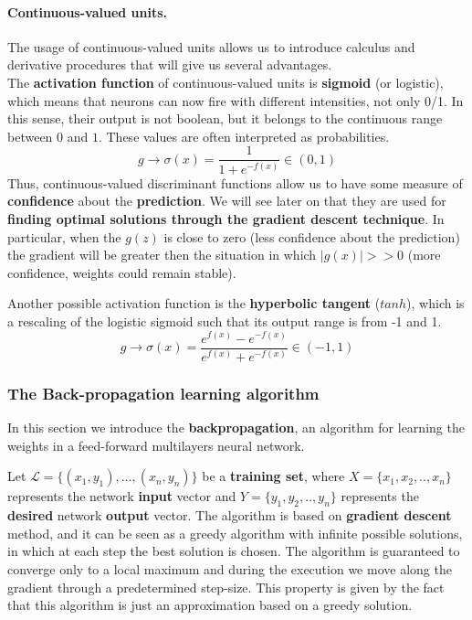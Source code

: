 

\paragraph*{Continuous-valued units.} The usage of continuous-valued units allows us to introduce calculus and derivative procedures that will give us several advantages.\\ 
The \textbf{activation function} of continuous-valued units is \textbf{sigmoid} (or logistic), which means that neurons can now fire with different intensities, not only 0/1. In this sense, their output is not boolean, but it belongs to the continuous range between $0$ and $1$. These values are often interpreted as probabilities.
$$g \rightarrow \sigma(x) = \frac{1}{1+e^{-f(x)}} \in (0,1)$$
Thus, continuous-valued discriminant functions allow us to have some measure of \textbf{confidence} about the \textbf{prediction}. We will see later on that they are used for \textbf{finding optimal solutions through the gradient descent technique}. In particular, when the $g(z)$ is close to zero (less confidence about the prediction) the gradient will be greater then the situation in which $|g(x)| >> 0$ (more confidence, weights could remain stable).

Another possible activation function is the \textbf{hyperbolic tangent} ($tanh$), which is a rescaling of the logistic sigmoid such that its output range is from -1 and 1. 
$$g \rightarrow \sigma(x) = \frac{e^{f(x)} - e^{-f(x)}}{e^{f(x)} + e^ {-f(x)}} \in (-1, 1)$$


\subsubsection{The Back-propagation learning algorithm}
In this section we introduce the \textbf{backpropagation}, an algorithm for learning the weights in a feed-forward multilayers neural network. 

Let $\mathcal{L} = \{(x_1, y_1), \dots, (x_n,y_n) \}$ be a \textbf{training set}, where $X = \{ x_1, x_2, .., x_n \}$ represents the network \textbf{input} vector and $Y = \{ y_1, y_2, .., y_n \}$ represents the \textbf{desired} network \textbf{output} vector. The algorithm is based on \textbf{gradient descent} method, and it can be seen as a greedy algorithm with infinite possible solutions, in which at each step the best solution is chosen. The algorithm is guaranteed to converge only to a local maximum and during the execution we move along the gradient through a predetermined step-size. This property is given by the fact that this algorithm is just an approximation based on a greedy solution.


